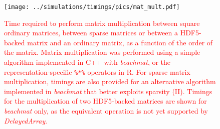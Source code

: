 \documentclass{article}
\newcommand{\beachmat}{\textit{beachmat}}
\newcommand{\code}[1]{\texttt{#1}}
\newcommand{\revised}[1]{\textcolor{red}{#1}}
\begin{document}
\begin{figure}[bt]
    \begin{center}
        \texttt{[image: ../simulations/timings/pics/mat\_mult.pdf]}
    \end{center}
    \caption{\revised{Time required to perform matrix multiplication between square ordinary matrices, between sparse matrices or between a HDF5-backed matrix and an ordinary matrix,
as a function of the order of the matrix.     
Matrix multiplication was performed using a simple algorithm implemented in C++ with \beachmat{}, or the representation-specific \code{\%*\%} operators in R.
For sparse matrix multiplication, timings are also provided for an alternative algorithm implemented in \beachmat{} that better exploits sparsity (II). 
Timings for the multiplication of two HDF5-backed matrices are shown for \beachmat{} only, as the equivalent operation is not yet supported by \textit{DelayedArray}.}}
    \label{fig:matmult}
\end{figure}

\end{document}
